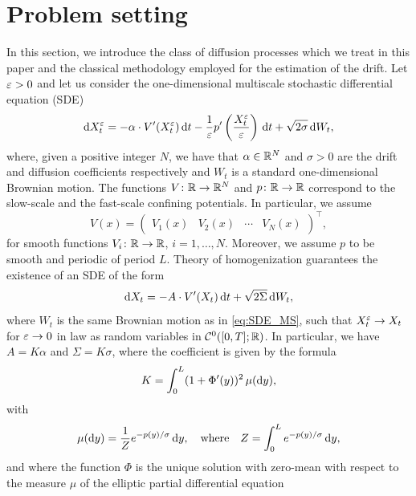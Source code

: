 \documentclass[review,onefignum,onetabnum]{siamonline190516}
\begin{document}
\section{Problem setting}\label{sec:Setting}

In this section, we introduce the class of diffusion processes which we treat in this paper and the classical methodology employed for the estimation of the drift. Let $\varepsilon > 0$ and let us consider the one-dimensional multiscale stochastic differential equation (SDE)
\begin{equation}\label{eq:SDE_MS}
	\d X_t^\epl = -\alpha \cdot V'(X_t^\epl) \dd t - \frac1\epl p'\left(\frac{X_t^\epl}\epl\right) \dd t + \sqrt{2\sigma} \dd W_t,
\end{equation}
where, given a positive integer $N$, we have that $\alpha \in \mathbb{R}^N$ and $\sigma > 0$ are the drift and diffusion coefficients respectively and $W_t$ is a standard one-dimensional Brownian motion. The functions $V\colon \mathbb{R} \to \mathbb{R}^N$ and $p\colon \mathbb{R} \to \mathbb{R}$ correspond to the slow-scale and the fast-scale confining potentials. In particular, we assume 
\begin{equation}\label{eq:Potential}
	V(x) = \begin{pmatrix} V_1(x) & V_2(x) & \cdots & V_N(x) \end{pmatrix}^\top,
\end{equation}
for smooth functions $V_i\colon \mathbb{R} \to \mathbb{R}$, $i = 1, \ldots, N$. Moreover, we assume $p$ to be smooth and periodic of period $L$. Theory of homogenization \cite[Chapter 3]{BLP78} guarantees the existence of an SDE of the form
\begin{equation}\label{eq:SDE_HOM}
	\d X_t = - A \cdot V'(X_t) \dd t + \sqrt{2\Sigma} \dd W_t,
\end{equation}
where $W_t$ is the same Brownian motion as in \eqref{eq:SDE_MS}, such that $X_t^\varepsilon \to X_t$ for $\varepsilon\to 0$ in law as random variables in $\mathcal C^0([0, T]; \mathbb{R})$. In particular, we have $A = K\alpha$ and $\Sigma = K \sigma$, where the coefficient  is given by the formula
\begin{equation}\label{eq:K_HOM}
	K = \int_0^L (1 + \Phi'(y))^2 \, \mu(\d y),
\end{equation}
with 
\begin{equation}
	\mu(\mathrm{d} y) = \frac1Z e^{-p(y)/\sigma} \,\mathrm{d} y, \quad\text{where}\quad Z = \int_0^L e^{-p(y)/\sigma} \,\mathrm{d} y,
\end{equation}
and where the function $\Phi$ is the unique solution with zero-mean with respect to the measure $\mu$ of the elliptic partial differential equation
\end{document}

